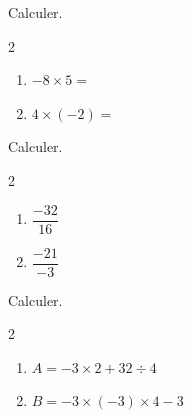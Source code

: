 \documentclass[a4paper,11pt,fleqn]{article}
\begin{document}
\begin{EXO}{}{}
Calculer.

\begin{multicols}{2}
\begin{enumerate}[itemsep=1em]
	\item \begin{minipage}[t]{\linewidth} $ -8 \times  5 =$ \end{minipage}
	\item \begin{minipage}[t]{\linewidth} $ 4 \times  (-2) =$ \end{minipage}
\end{enumerate}
\end{multicols}
\end{EXO}

\begin{EXO}{}{}
Calculer.

\begin{multicols}{2}
\begin{enumerate}[itemsep=1em]
	\item \begin{minipage}[t]{\linewidth} $\dfrac{-32}{16}$ \end{minipage}
	\item \begin{minipage}[t]{\linewidth} $\dfrac{-21}{-3}$ \end{minipage}
\end{enumerate}
\end{multicols}
\end{EXO}

\begin{EXO}{}{}
Calculer.

\begin{multicols}{2}
\begin{enumerate}[itemsep=1em,label={}]
	\item \begin{minipage}[t]{\linewidth} $A = -3\times2+32\div4$ \end{minipage}
	\item \begin{minipage}[t]{\linewidth} $B = -3\times(-3)\times4-3$ \end{minipage}
\end{enumerate}
\end{multicols}
\end{EXO}
\end{document}
